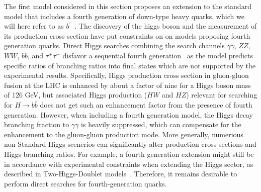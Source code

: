 The first model considered in this section proposes an extension to the standard model that includes a fourth generation of down-type heavy quarks, which we will here refer to as $b^\prime$~\cite{Holdom:2006mr}.
The discovery of the higgs boson and the measurement of its production cross-section have put constraints on on models proposing fourth generation quarks.
Direct Higgs searches combining the search channels $\gamma \gamma$, $ZZ$, $WW$, $b\bar{b}$, and $\tau^{+} \tau^{-}$ disfavor a sequential fourth generation~\cite{Eberhardt:2012gv,Djouadi:2012ae,Eberhardt:2012sb,Eberhardt:2012ck} as the model predicts specific ratios of branching ratios into final states which are not supported by the experimental results.
Specifically, Higgs production cross section in gluon-gluon fusion at the LHC is enhanced by about a factor of nine for a Higgs boson mass of 126 GeV, but associated Higgs production ($HW$ and $HZ$) relevant for searching for $H \rightarrow b\bar{b}$ does not get such an enhancement factor from the presence of fourth generation.
However, when including a fourth generation model, the Higgs decay branching fraction to $\gamma \gamma$ is heavily suppressed, which can compensate for the enhancement to the gluon-gluon production mode.
More generally, numerious non-Standard Higgs scenerios can significantly alter production cross-sections and Higgs branching ratios.
For example, a fourth generation extension might still be in accordance with experimental constraints when extending the Higgs sector, as described in Two-Higgs-Doublet models~\cite{BarShalom:2012ms}. 
Therefore, it remains desirable to perform direct searches for fourth-generation quarks.

